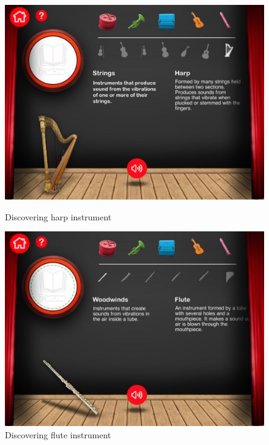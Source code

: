 \begin{figure}[ht!]
  \centering
  \includegraphics[width=350pt]{graphics/additional-screens/discovering_strings_harp_screen.jpg}
  \vspace{0.05cm}
  \caption{Discovering harp instrument}
  \vspace{0.6cm}

  \includegraphics[width=350pt]{graphics/additional-screens/discovering_wind_flute_screen.jpg}
  \vspace{0.05cm}
  \caption{Discovering flute instrument}
\end{figure}


